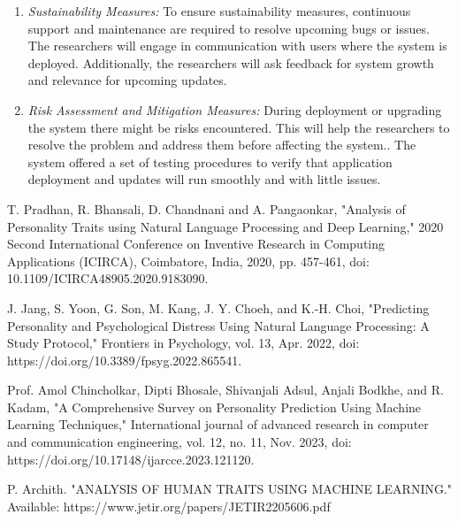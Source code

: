 \documentclass[conference]{IEEEtran}
\begin{document}
    \begin{enumerate}
        \item \textit{Sustainability Measures:} To ensure sustainability measures, continuous support
            and maintenance are required to resolve upcoming bugs or issues. The researchers will
            engage in communication with users where the system is deployed. Additionally, the
            researchers will ask feedback for system growth and relevance for upcoming updates.

        \item \textit{Risk Assessment and Mitigation Measures:} During deployment or upgrading the
            system there might be risks encountered. This will help the researchers to resolve the problem
            and address them before affecting the system.. The system offered a set of testing procedures
            to verify that application deployment and updates will run smoothly and with little issues.
    \end{enumerate}

    \begin{thebibliography}{00}
         T. Pradhan, R. Bhansali, D. Chandnani and A. Pangaonkar, "Analysis of Personality
            Traits using Natural Language Processing and Deep Learning," 2020 Second International Conference
            on Inventive Research in Computing Applications (ICIRCA), Coimbatore, India, 2020, pp.
            457-461, doi: 10.1109/ICIRCA48905.2020.9183090.

         J. Jang, S. Yoon, G. Son, M. Kang, J. Y. Choeh, and K.-H. Choi, "Predicting
            Personality and Psychological Distress Using Natural Language Processing: A Study Protocol,"
            Frontiers in Psychology, vol. 13, Apr. 2022, doi: https://doi.org/10.3389/fpsyg.2022.865541.

         Prof. Amol Chincholkar, Dipti Bhosale, Shivanjali Adsul, Anjali Bodkhe, and R. Kadam,
            "A Comprehensive Survey on Personality Prediction Using Machine Learning Techniques," International
            journal of advanced research in computer and communication engineering, vol. 12, no. 11,
            Nov. 2023, doi: https://doi.org/10.17148/ijarcce.2023.121120.

         P. Archith. "ANALYSIS OF HUMAN TRAITS USING MACHINE LEARNING." Available: https://www.jetir.org/papers/JETIR2205606.pdf
    \end{thebibliography}
    \vspace{12pt}
\end{document}
